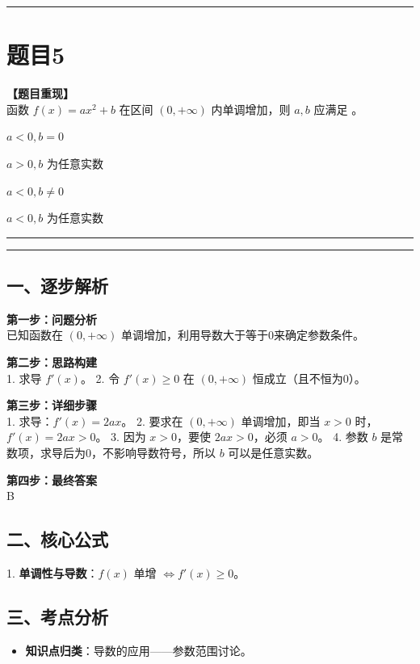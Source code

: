 \documentclass[12pt, a4paper]{ctexart}
\newcommand{\TopSeparator}{
    \par\noindent\rule{\textwidth}{1.5pt}\vspace{0.5em} %
}
\newcommand{\AnalysisSeparator}{
    \par\noindent\rule{\textwidth}{0.5pt}\vspace{0.2em}\hrule\vspace{0.5em} %
}
\newenvironment{RedAnalysis}{
    \par
    \color{red} %
}{
    \par
    \color{black} %
}
\newcommand{\choicesTwo}[4]{
    \begin{enumerate}[label=\Alph*., itemsep=0pt, parsep=0pt, topsep=5pt, labelsep=0.5em]
        \begin{minipage}{0.45\linewidth} \item #1 \end{minipage}
        \begin{minipage}{0.45\linewidth} \item #2 \end{minipage}
        \begin{minipage}{0.45\linewidth} \item #3 \end{minipage}
        \begin{minipage}{0.45\linewidth} \item #4 \end{minipage}
    \end{enumerate}
}
\begin{document}
\vspace{2em}

\TopSeparator
\section*{题目5}

\textbf{【题目重现】} \\
函数 $ f(x)=ax^{2}+b $ 在区间 $ (0,+\infty) $ 内单调增加，则 $a,b$ 应满足 \underline{\hspace{1cm}}。
\choicesTwo
{$a<0,b=0$}
{$a>0,b$ 为任意实数}
{$a<0,b\neq0$}
{$a<0,b$ 为任意实数}

\AnalysisSeparator

\begin{RedAnalysis}

\subsection*{一、逐步解析}

\textbf{第一步：问题分析} \\
已知函数在 $(0, +\infty)$ 单调增加，利用导数大于等于0来确定参数条件。

\textbf{第二步：思路构建} \\
1. 求导 $f'(x)$。
2. 令 $f'(x) \ge 0$ 在 $(0, +\infty)$ 恒成立（且不恒为0）。

\textbf{第三步：详细步骤} \\
1. 求导：$f'(x) = 2ax$。
2. 要求在 $(0, +\infty)$ 单调增加，即当 $x > 0$ 时，$f'(x) = 2ax > 0$。
3. 因为 $x > 0$，要使 $2ax > 0$，必须 $a > 0$。
4. 参数 $b$ 是常数项，求导后为0，不影响导数符号，所以 $b$ 可以是任意实数。

\textbf{第四步：最终答案} \\
B

\subsection*{二、核心公式}
1. \textbf{单调性与导数}：$f(x)$ 单增 $\Leftrightarrow f'(x) \ge 0$。

\subsection*{三、考点分析}
\begin{itemize}
    \item \textbf{知识点归类}：导数的应用——参数范围讨论。
\end{itemize}

\end{RedAnalysis}
\end{document}
